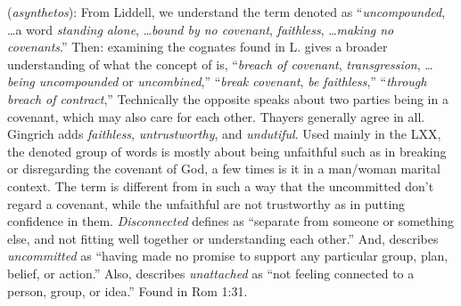\item[Uncommitted,]

(\textit{asynthetos}):
From Liddell, we understand the term denoted as ``\emph{uncompounded}, \ldots a word \emph{standing alone}, \ldots \emph{bound by no covenant}, \emph{faithless}, \ldots \emph{making no covenants}.''
Then: examining the cognates found in L. gives a broader understanding of what the concept of  is,
 ``\emph{breach of covenant}, \emph{transgression}, \ldots \emph{being uncompounded} or \emph{uncombined},''
 ``\emph{break covenant}, \emph{be faithless},''
 ``\emph{through breach of contract},''
Technically the opposite speaks about two parties being in a covenant, which may also care for each other. 
Thayers generally agree in all. Gingrich adds \emph{faithless},  \emph{untrustworthy}, and \emph{undutiful}. 
Used mainly in the LXX, the denoted  group of words is mostly about being unfaithful such as in breaking or disregarding the covenant of God, a few times is it in a man/woman marital context.
The term is different from   in such a way that the uncommitted don't regard a covenant, while the unfaithful are not trustworthy as in putting confidence in them. 
\emph{Disconnected} defines as ``separate from someone or something else, and not fitting well together or understanding each other.'' And, describes \emph{uncommitted} as ``having made no promise to support any particular group, plan, belief, or action.'' Also, describes \emph{unattached} as ``not feeling connected to a person, group, or idea.''
Found in Rom 1:31.
